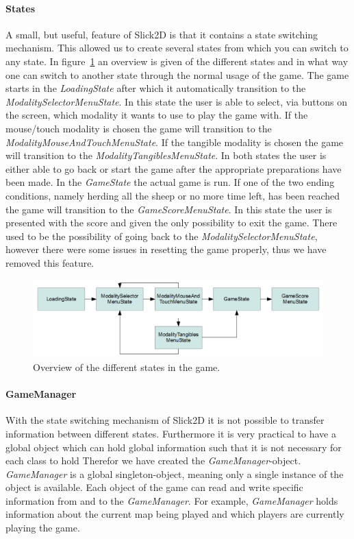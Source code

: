 \documentclass[a4paper,10pt]{report}
\begin{document}
		\paragraph{States}
		A small, but useful, feature of Slick2D is that it contains a state switching mechanism.
		This allowed us to create several states from which you can switch to any state.
		In figure~\ref{fig:game-state-diagram} an overview is given of the different states and in what way one can switch to another state through the normal usage of the game.
		The game starts in the \emph{LoadingState} after which it automatically transition to the \emph{ModalitySelectorMenuState}.
		In this state the user is able to select, via buttons on the screen, which modality it wants to use to play the game with.
		If the mouse/touch modality is chosen the game will transition to the \emph{ModalityMouseAndTouchMenuState}.
		If the tangible modality is chosen the game will transition to the \emph{ModalityTangiblesMenuState}.
		In both states the user is either able to go back or start the game after the appropriate preparations have been made.
		In the \emph{GameState} the actual game is run.
		If one of the two ending conditions, namely herding all the sheep or no more time left, has been reached the game will transition to the \emph{GameScoreMenuState}.
		In this state the user is presented with the score and given the only possibility to exit the game.
		There used to be the possibility of going back to the \emph{ModalitySelectorMenuState}, however there were some issues in resetting the game properly, thus we have removed this feature.
		
		\begin{figure}
			\includegraphics[width=\columnwidth]{images/game-state-diagram.png}
			\caption{Overview of the different states in the game.}
			\label{fig:game-state-diagram}
		\end{figure}
		
		\paragraph{GameManager}
		With the state switching mechanism of Slick2D it is not possible to transfer information between different states.
		Furthermore it is very practical to have a global object which can hold global information such that it is not necessary for each class to hold 
		Therefor we have created the \emph{GameManager}-object.
		\emph{GameManager} is a global singleton-object, meaning only a single instance of the object is available.
		Each object of the game can read and write specific information from and to the \emph{GameManager}.
		For example, \emph{GameManager} holds information about the current map being played and which players are currently playing the game.		
		
\end{document}
